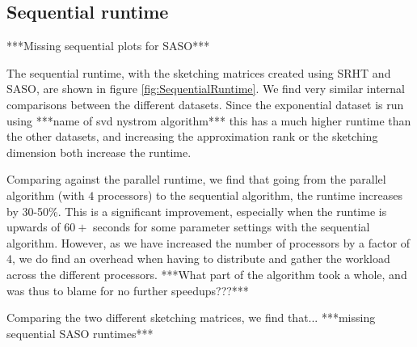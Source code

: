\documentclass{article}
\theoremstyle{definition}
\begin{document}
\subsection{Sequential runtime}
***Missing sequential plots for SASO***

The sequential runtime, with the sketching matrices created using SRHT and SASO, are shown in figure \ref{fig:SequentialRuntime}. We find very similar internal comparisons between the different datasets. Since the exponential dataset is run using ***name of svd nystrom algorithm*** this has a much higher runtime than the other datasets, and increasing the approximation rank or the sketching dimension both increase the runtime. 

Comparing against the parallel runtime, we find that going from the parallel algorithm (with $4$ processors) to the sequential algorithm, the runtime increases by 30-50\%. This is a significant improvement, especially when the runtime is upwards of $60+$ seconds for some parameter settings with the sequential algorithm. However, as we have increased the number of processors by a factor of $4$, we do find an overhead when having to distribute and gather the workload across the different processors. ***What part of the algorithm took a whole, and was thus to blame for no further speedups???***

Comparing the two different sketching matrices, we find that... ***missing sequential SASO runtimes***
\end{document}

